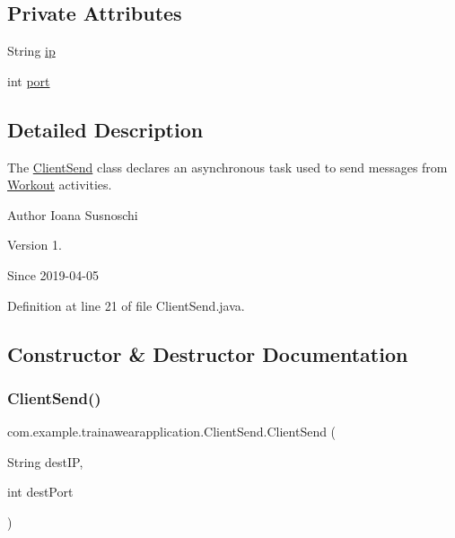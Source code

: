 \subsection*{Private Attributes}
\begin{DoxyCompactItemize}
\item 
String \mbox{\hyperlink{classcom_1_1example_1_1trainawearapplication_1_1_client_send_ad35299d12486a041cdcbcffab3cc320f}{ip}}
\item 
int \mbox{\hyperlink{classcom_1_1example_1_1trainawearapplication_1_1_client_send_a1295f5916c4527127a9dd68b7c6fe759}{port}}
\end{DoxyCompactItemize}


\subsection{Detailed Description}
The \mbox{\hyperlink{classcom_1_1example_1_1trainawearapplication_1_1_client_send}{Client\+Send}} class declares an asynchronous task used to send messages from \mbox{\hyperlink{classcom_1_1example_1_1trainawearapplication_1_1_workout}{Workout}} activities. 

\begin{DoxyAuthor}{Author}
Ioana Susnoschi 
\end{DoxyAuthor}
\begin{DoxyVersion}{Version}
1. 
\end{DoxyVersion}
\begin{DoxySince}{Since}
2019-\/04-\/05 
\end{DoxySince}


Definition at line 21 of file Client\+Send.\+java.



\subsection{Constructor \& Destructor Documentation}
\mbox{\label{classcom_1_1example_1_1trainawearapplication_1_1_client_send_ab1f011085d4305f586a7074a46e73450}} 
\subsubsection{\texorpdfstring{ClientSend()}{ClientSend()}}
{\footnotesize\ttfamily com.\+example.\+trainawearapplication.\+Client\+Send.\+Client\+Send (\begin{DoxyParamCaption}\item[{String}]{dest\+IP,  }\item[{int}]{dest\+Port }\end{DoxyParamCaption})}



